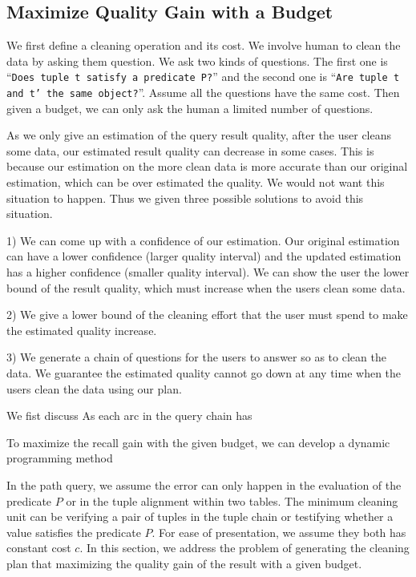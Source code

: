 \subsection{Maximize Quality Gain with a Budget}\label{subsec:gain}

We first define a cleaning operation and its cost. We involve human to clean the
data by asking them question. We ask two kinds of questions. The first one is
``\texttt{Does tuple t satisfy a predicate P?}'' and the second one is
``\texttt{Are tuple t and t' the same object?}''. Assume all the questions have
the same cost. Then given a budget, we can only ask the human a limited number
of questions.

As we only give an estimation of the query result quality, after the user cleans
some data, our estimated result quality can decrease in some cases. This is
because our estimation on the more clean data is more accurate than our original
estimation, which can be over estimated the quality. We would not want this
situation to happen. Thus we given three possible solutions to avoid this
situation. 


1) We can come up with a confidence of our estimation. Our original estimation
can have a lower confidence (larger quality interval) and the updated estimation
has a higher confidence (smaller quality interval). We can show the user the
lower bound of the result quality, which must increase when the users clean some
data.

2) We give a lower bound of the cleaning effort that the user must spend to make
the estimated quality increase.

3) We generate a chain of questions for the users to answer so as to clean the
data. We guarantee the estimated quality cannot go down at any time when the
users clean the data using our plan.


\iffalse
We fist discuss As each arc in the query chain has 

To maximize the recall gain with the given budget, we can develop a dynamic programming method

In the path query, we assume the error can only happen in the evaluation of the
predicate $P$ or in the tuple alignment within two tables. The minimum cleaning
unit can be verifying a pair of tuples in the tuple chain or testifying whether
a value satisfies the predicate $P$. For ease of presentation, we assume they
both has constant cost $c$. In this section, we address the problem of
generating the cleaning plan that maximizing the quality gain of the result with
a given budget.

